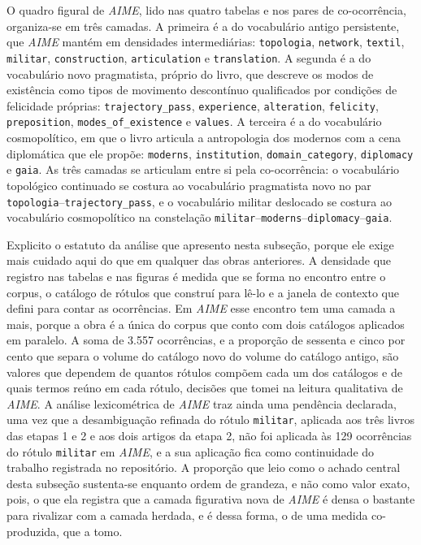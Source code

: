 O quadro figural de \textit{AIME}, lido nas quatro tabelas e nos pares de co-ocorrência, organiza-se em três camadas. A primeira é a do vocabulário antigo persistente, que \textit{AIME} mantém em densidades intermediárias: \texttt{topologia}, \texttt{network}, \texttt{textil}, \texttt{militar}, \texttt{construction}, \texttt{articulation} e \texttt{translation}. A segunda é a do vocabulário novo pragmatista, próprio do livro, que descreve os modos de existência como tipos de movimento descontínuo qualificados por condições de felicidade próprias: \texttt{trajectory\_pass}, \texttt{experience}, \texttt{alteration}, \texttt{felicity}, \texttt{preposition}, \texttt{modes\_of\_existence} e \texttt{values}. A terceira é a do vocabulário cosmopolítico, em que o livro articula a antropologia dos modernos com a cena diplomática que ele propõe: \texttt{moderns}, \texttt{institution}, \texttt{domain\_category}, \texttt{diplomacy} e \texttt{gaia}. As três camadas se articulam entre si pela co-ocorrência: o vocabulário topológico continuado se costura ao vocabulário pragmatista novo no par \texttt{topologia}--\texttt{trajectory\_pass}, e o vocabulário militar deslocado se costura ao vocabulário cosmopolítico na constelação \texttt{militar}--\texttt{moderns}--\texttt{diplomacy}--\texttt{gaia}.

Explicito o estatuto da análise que apresento nesta subseção, porque ele exige mais cuidado aqui do que em qualquer das obras anteriores. A densidade que registro nas tabelas e nas figuras é medida que se forma no encontro entre o corpus, o catálogo de rótulos que construí para lê-lo e a janela de contexto que defini para contar as ocorrências. Em \textit{AIME} esse encontro tem uma camada a mais, porque a obra é a única do corpus que conto com dois catálogos aplicados em paralelo. A soma de 3.557 ocorrências, e a proporção de sessenta e cinco por cento que separa o volume do catálogo novo do volume do catálogo antigo, são valores que dependem de quantos rótulos compõem cada um dos catálogos e de quais termos reúno em cada rótulo, decisões que tomei na leitura qualitativa de \textit{AIME}. A análise lexicométrica de \textit{AIME} traz ainda uma pendência declarada, uma vez que a desambiguação refinada do rótulo \texttt{militar}, aplicada aos três livros das etapas 1 e 2 e aos dois artigos da etapa 2, não foi aplicada às 129 ocorrências do rótulo \texttt{militar} em \textit{AIME}, e a sua aplicação fica como continuidade do trabalho registrada no repositório. A proporção que leio como o achado central desta subseção sustenta-se enquanto ordem de grandeza, e não como valor exato, pois, o que ela registra que a camada figurativa nova de \textit{AIME} é densa o bastante para rivalizar com a camada herdada, e é dessa forma, o de uma medida co-produzida, que a tomo.

